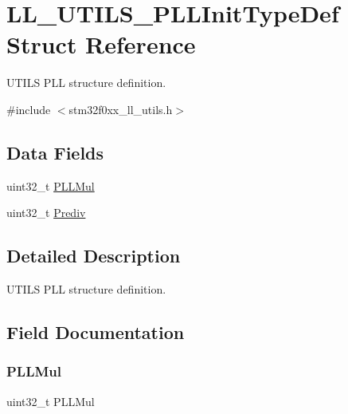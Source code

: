\hypertarget{struct_l_l___u_t_i_l_s___p_l_l_init_type_def}{}\section{L\+L\+\_\+\+U\+T\+I\+L\+S\+\_\+\+P\+L\+L\+Init\+Type\+Def Struct Reference}
\label{struct_l_l___u_t_i_l_s___p_l_l_init_type_def}


U\+T\+I\+LS P\+LL structure definition.  




{\ttfamily \#include $<$stm32f0xx\+\_\+ll\+\_\+utils.\+h$>$}

\subsection*{Data Fields}
\begin{DoxyCompactItemize}
\item 
uint32\+\_\+t \hyperlink{struct_l_l___u_t_i_l_s___p_l_l_init_type_def_a1e7c22497d52fbfcd240d98c6a0ba7df}{P\+L\+L\+Mul}
\item 
uint32\+\_\+t \hyperlink{struct_l_l___u_t_i_l_s___p_l_l_init_type_def_ad1b63b2eb36e28612c093044511dab54}{Prediv}
\end{DoxyCompactItemize}


\subsection{Detailed Description}
U\+T\+I\+LS P\+LL structure definition. 

\subsection{Field Documentation}
\mbox{\label{struct_l_l___u_t_i_l_s___p_l_l_init_type_def_a1e7c22497d52fbfcd240d98c6a0ba7df}} 
\subsubsection{\texorpdfstring{P\+L\+L\+Mul}{PLLMul}}
{\footnotesize\ttfamily uint32\+\_\+t P\+L\+L\+Mul}

